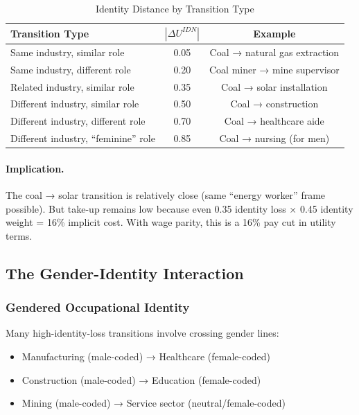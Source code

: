\begin{table}[htbp]
\centering
\caption{Identity Distance by Transition Type}
\label{tab:identity-distance}
\begin{tabular}{@{}lcc@{}}
\toprule
\textbf{Transition Type} & \textbf{$|\Delta U^{IDN}|$} & \textbf{Example} \\
\midrule
Same industry, similar role & 0.05 & Coal → natural gas extraction \\
Same industry, different role & 0.20 & Coal miner → mine supervisor \\
Related industry, similar role & 0.35 & Coal → solar installation \\
Different industry, similar role & 0.50 & Coal → construction \\
Different industry, different role & 0.70 & Coal → healthcare aide \\
Different industry, ``feminine'' role & 0.85 & Coal → nursing (for men) \\
\bottomrule
\end{tabular}
\end{table}

\paragraph{Implication.}
The coal → solar transition is relatively close (same ``energy worker'' 
frame possible). But take-up remains low because even 0.35 identity 
loss × 0.45 identity weight = 16\% implicit cost. With wage parity, 
this is a 16\% pay cut in utility terms.

\subsection{The Gender-Identity Interaction}

\subsubsection{Gendered Occupational Identity}

Many high-identity-loss transitions involve crossing gender lines:

\begin{itemize}
    \item Manufacturing (male-coded) → Healthcare (female-coded)
    \item Construction (male-coded) → Education (female-coded)
    \item Mining (male-coded) → Service sector (neutral/female-coded)
\end{itemize}

